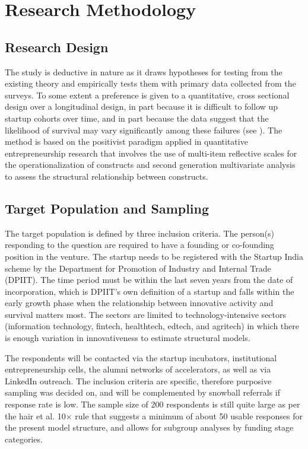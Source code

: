 \documentclass{ieeeaccess}
\begin{document}
\section{Research Methodology}
\label{sec:method}

\subsection{Research Design}

The study is deductive in nature as it draws hypotheses for testing from the existing theory and empirically tests them with primary data collected from the surveys. To some extent a preference is given to a quantitative, cross sectional design over a longitudinal design, in part because it is difficult to follow up startup cohorts over time, and in part because the data suggest that the likelihood of survival may vary significantly among these failures (see \cite{b21}). The method is based on the positivist paradigm applied in quantitative entrepreneurship research that involves the use of multi-item reflective scales for the operationalization of constructs and second generation multivariate analysis to assess the structural relationship between constructs.

\subsection{Target Population and Sampling}

The target population is defined by three inclusion criteria. The person(s) responding to the question are required to have a founding or co-founding position in the venture. The startup needs to be registered with the Startup India scheme by the Department for Promotion of Industry and Internal Trade (DPIIT). The time period must be within the last seven years from the date of incorporation, which is DPIIT's own definition of a startup and falls within the early growth phase when the relationship between innovative activity and survival matters most. The sectors are limited to technology-intensive sectors (information technology, fintech, healthtech, edtech, and agritech) in which there is enough variation in innovativeness to estimate structural models.

The respondents will be contacted via the startup incubators, institutional entrepreneurship cells, the alumni networks of accelerators, as well as via LinkedIn outreach. The inclusion criteria are specific, therefore purposive sampling was decided on, and will be complemented by snowball referrals if response rate is low. The sample size of 200 respondents is still quite large as per the hair et al. 10× rule \cite{b22} that suggests a minimum of about 50 usable responses for the present model structure, and allows for subgroup analyses by funding stage categories.
\end{document}
